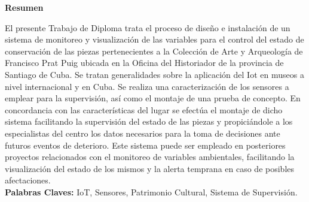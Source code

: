 \setcounter{page}{4}
\thispagestyle{plain}

    \textbf{\LARGE Resumen}
\newline

El presente Trabajo de Diploma trata el proceso de diseño e instalación de un sistema de monitoreo y visualización de las variables para el control del estado de conservación de las piezas pertenecientes a la Colección de Arte y Arqueología de Francisco Prat Puig ubicada en la Oficina del Historiador de la provincia de Santiago de Cuba. Se tratan generalidades sobre la aplicación del Iot en museos a nivel internacional y en Cuba. Se realiza una caracterización de los sensores a emplear para la supervisión, así como el montaje de una prueba de concepto.
En concordancia con las características del lugar se efectúa el montaje de dicho sistema facilitando la supervisión del estado de las piezas y propiciándole a los especialistas del centro los datos necesarios para la toma de decisiones ante futuros eventos de deterioro. Este sistema puede ser empleado en posteriores proyectos relacionados con el monitoreo de variables ambientales, facilitando la visualización del estado de los mismos y la alerta temprana en caso de posibles afectaciones.\\

\textbf{Palabras Claves: } IoT, Sensores, Patrimonio Cultural, Sistema de Supervisión. 
